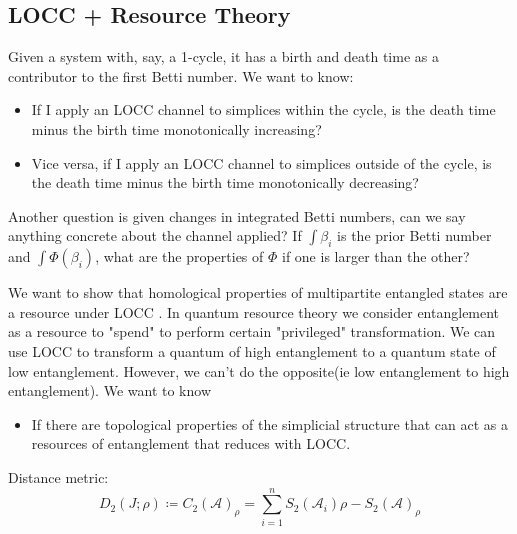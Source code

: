 \subsection{LOCC + Resource Theory}
Given a system with, say, a 1-cycle, it has a birth and death time as a contributor to the first Betti number. We want to know:
\begin{itemize}
    \item If I apply an LOCC channel to simplices within the cycle, is the death time minus the birth time monotonically increasing?
    \item Vice versa, if I apply an LOCC channel to simplices outside of the cycle, is the death time minus the birth time monotonically decreasing?
\end{itemize}
Another question is given changes in integrated Betti numbers, can we say anything concrete about the channel applied? If $\int \beta_i$ is the prior Betti number and $\int \Phi (\beta_i)$, what are the properties of $\Phi$ if one is larger than the other?

We want to show that homological properties of multipartite entangled states are a resource under LOCC \cite{RevModPhys.91.025001}. In quantum resource theory we consider entanglement as a resource to "spend" to perform certain "privileged" transformation. We can use LOCC to transform a quantum of high entanglement to a quantum state of low entanglement. However, we can't do the opposite(ie low entanglement to high entanglement). We want to know
\begin{itemize}
    \item If there are topological properties of the simplicial structure that can act as a resources of entanglement that reduces with LOCC.
\end{itemize}


Distance metric:
\begin{equation}
    D_2(J; \rho) \coloneqq 
    C_2(\mathcal{A})_\rho = \sum^n_{i=1} S_2(\mathcal{A}_i)\rho - S_2(\mathcal{A})_\rho
\end{equation}
